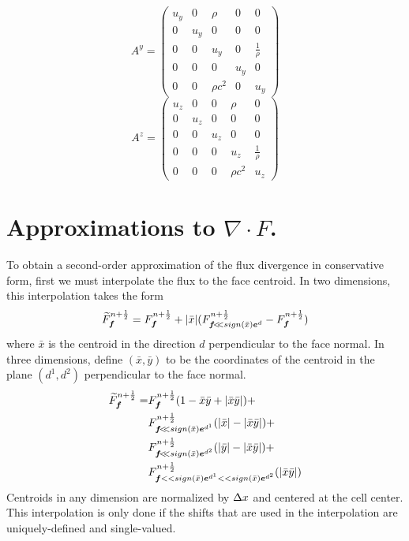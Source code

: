 \begin{equation*}
A^y = \left( \begin{array}{ccccc} 
 u_y       & 0         & \rho     &  0       & 0                \\
 0         & u_y       & 0        &  0       & 0                \\
 0         & 0         & u_y      &  0       & \frac{1}{\rho}   \\
 0         & 0         & 0        & u_y      & 0                \\
 0         & 0         & \rho c^2 &  0       & u_y  
\end{array}        \right)
\end{equation*}
\begin{equation*}
A^z = \left( \begin{array}{ccccc} 
 u_z       & 0         & 0        & \rho     & 0                \\
 0         & u_z       & 0        &  0       & 0                \\
 0         & 0         & u_z      &  0       & 0                \\
 0         & 0         & 0        & u_z      & \frac{1}{\rho}   \\
 0         & 0         & 0        &\rho c^2  & u_z
\end{array}        \right)
\end{equation*}

\section{Approximations to $\nabla \cdot F$.}
\label{sec::divf}

To obtain a second-order approximation of the flux divergence in
conservative form, first we must interpolate the flux to the face
centroid.  In two dimensions, this interpolation takes the form
\begin{gather}
\widetilde{F}^{n + \frac{1}{2}}_{\boldsymbol{f}} = 
F^{n + \frac{1}{2}}_{\boldsymbol{f}}  + |\bar x| 
(F^{n + \frac{1}{2}}_{{{\boldsymbol{f}}} \! < \!\! < \! {\,sign(\bar x) {\boldsymbol{e}}^d}}-F^{n + \frac{1}{2}}_{\boldsymbol{f}}) 
\end{gather}
where $\bar x$ is the centroid in the direction $d$ perpendicular to the
face normal. In three dimensions, define $(\bar x, \bar y)$ to be the
coordinates of the centroid in the plane $(d^1, d^2)$ perpendicular 
to the face normal. 
\begin{align}
\widetilde{F}^\nph_\fbold =& 
F^\nph_\fbold( 1 -\bar x \bar y + |\bar x \bar y | ) + \\
&F^\nph_{\ebshift{\fbold}{\,sign(\bar x) \ebold^{d^1}}} 
(|\bar x| - |\bar x \bar y|) + \\
&F^\nph_{\ebshift{\fbold}{\,sign(\bar x) \ebold^{d^2}}} 
(|\bar y| - |\bar x \bar y|) + \\
&F^\nph_{\fbold << sign(\bar x) \ebold^{d^1} << sign(\bar x)
\ebold^{d^2}}  (|\bar x \bar y |)
\end{align}
Centroids in any dimension are normalized by $\Delta x$ and centered at the
cell center.   This interpolation is only done if the shifts that are
used in the interpolation are uniquely-defined and single-valued.

